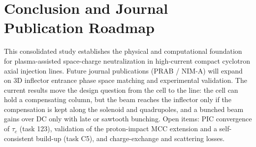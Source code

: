 \documentclass[11pt,a4paper]{article}
\newcommand{\new}[1]{\textcolor{blue!60!black}{#1}}
\begin{document}
\section{Conclusion and Journal Publication Roadmap}
This consolidated study establishes the physical and computational foundation for plasma-assisted space-charge neutralization in high-current compact cyclotron axial injection lines. Future journal publications (PRAB / NIM-A) will expand on 3D inflector entrance phase space matching and experimental validation.
\new{The current results move the design question from the cell to the line: the cell can hold a
compensating column, but the beam reaches the inflector only if the compensation is kept along the
solenoid and quadrupoles, and a bunched beam gains over DC only with late or sawtooth bunching.
Open items: PIC convergence of $\tau_c$ (task 123), validation of the proton-impact MCC extension
and a self-consistent build-up (task C5), and charge-exchange and scattering losses.}



\end{document}
